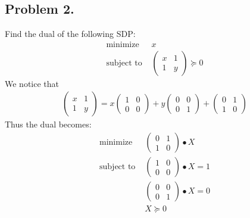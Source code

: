 \documentclass[12pt]{article}
\theoremstyle{definitionstyle}
\begin{document}
    \subsection*{Problem 2.}
    Find the dual of the following SDP:
    \begin{align*}
        \text{minimize } & x \\
        \text{subject to } & \begin{pmatrix}
            x & 1 \\ 
            1 & y
        \end{pmatrix} \succeq 0
    \end{align*}
    We notice that 
    \begin{align*}
        \begin{pmatrix}
            x & 1 \\ 
            1 & y
        \end{pmatrix} = x\begin{pmatrix}
            1 & 0 \\ 
            0 & 0
        \end{pmatrix} + y\begin{pmatrix}
            0 & 0 \\ 
            0 & 1
        \end{pmatrix} + \begin{pmatrix}
            0 & 1 \\ 
            1 & 0
        \end{pmatrix}
    \end{align*}
    Thus the dual becomes:
    \begin{align*}
        \text{minimize } & \begin{pmatrix}
            0 & 1 \\ 
            1 & 0
        \end{pmatrix} \bullet X \\
        \text{subject to } & \begin{pmatrix}
            1 & 0 \\ 
            0 & 0
        \end{pmatrix} \bullet X = 1 \\
        & \begin{pmatrix}
            0 & 0 \\ 
            0 & 1
        \end{pmatrix} \bullet X = 0 \\
        & X \succeq 0
    \end{align*}
\end{document}
